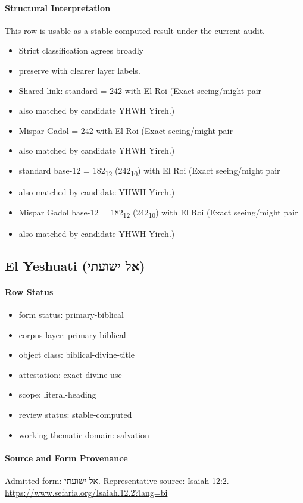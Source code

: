 \paragraph{Structural Interpretation}
This row is usable as a stable computed result under the current audit.

\begin{itemize}
\item Strict classification agrees broadly
\item preserve with clearer layer labels.
\item Shared link: standard = 242 with El Roi (Exact seeing/might pair
\item also matched by candidate YHWH Yireh.)
\item Mispar Gadol = 242 with El Roi (Exact seeing/might pair
\item also matched by candidate YHWH Yireh.)
\item standard base-12 = 182\textsubscript{12} (242\textsubscript{10}) with El Roi (Exact seeing/might pair
\item also matched by candidate YHWH Yireh.)
\item Mispar Gadol base-12 = 182\textsubscript{12} (242\textsubscript{10}) with El Roi (Exact seeing/might pair
\item also matched by candidate YHWH Yireh.)
\end{itemize}

\subsection{El Yeshuati (אל ישועתי)}
\paragraph{Row Status}
\begin{itemize}
\item form status: primary-biblical
\item corpus layer: primary-biblical
\item object class: biblical-divine-title
\item attestation: exact-divine-use
\item scope: literal-heading
\item review status: stable-computed
\item working thematic domain: salvation
\end{itemize}
\paragraph{Source and Form Provenance}
Admitted form: אל ישועתי.
Representative source: Isaiah 12:2.
\url{https://www.sefaria.org/Isaiah.12.2?lang=bi}
